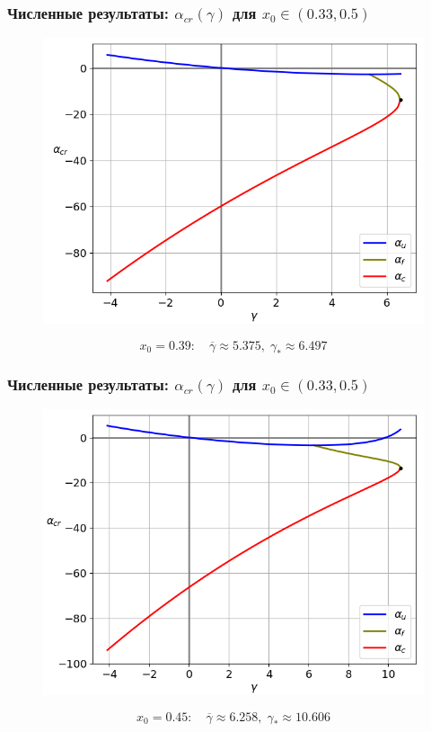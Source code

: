 \documentclass[fullscreen=true, unicode, bookmarks=false]{beamer}
\begin{document}
\begin{frame}
\frametitle{ Численные результаты: $ \alpha_{cr}(\gamma) $ для $ x_0 \in (0.33, 0.5) $ }

\begin{figure} 
\includegraphics[scale=0.55]{alphas_039.png}  
\end{figure}

$$ x_0 = 0.39: \quad \overline{\gamma} \approx 5.375, \; \gamma_* \approx 6.497 $$

\end{frame}

\begin{frame}
\frametitle{ Численные результаты: $ \alpha_{cr}(\gamma) $ для $ x_0 \in (0.33, 0.5) $ }

\begin{figure} 
\includegraphics[scale=0.55]{alphas_045.png}  
\end{figure}

$$ x_0 = 0.45: \quad \overline{\gamma} \approx 6.258, \; \gamma_* \approx 10.606 $$

\end{frame}
\end{document}
